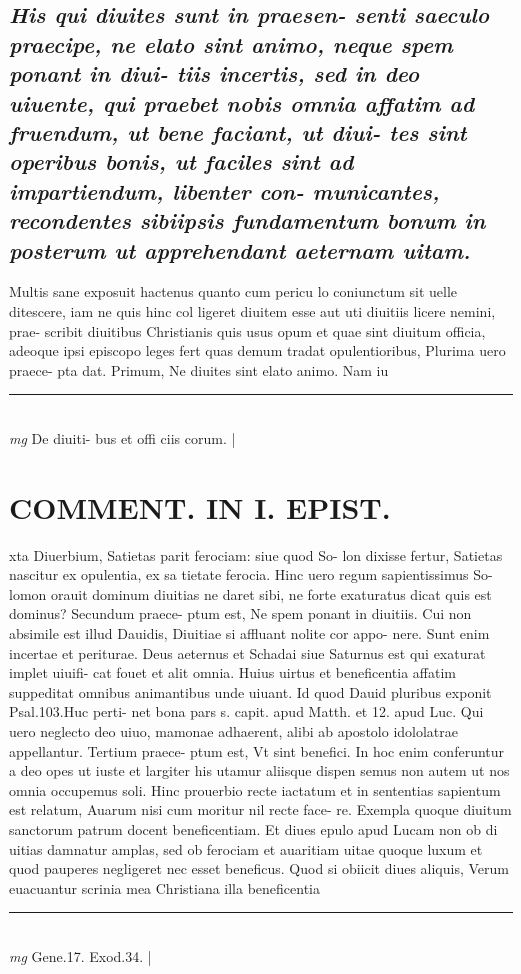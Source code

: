 \documentclass{article}
\begin{document}
\begin{pages}
\subsection*{\textit{His qui diuites sunt in praesen- senti saeculo praecipe, ne elato sint animo, neque spem ponant in diui- tiis incertis, sed in deo uiuente, qui praebet nobis omnia affatim ad fruendum, ut bene faciant, ut diui- tes sint operibus bonis, ut faciles sint ad impartiendum, libenter con- municantes, recondentes sibiipsis fundamentum bonum in posterum ut apprehendant aeternam uitam. }}\pstart Multis sane exposuit hactenus quanto cum pericu lo coniunctum sit uelle ditescere, iam ne quis hinc col ligeret diuitem esse aut uti diuitiis licere nemini, prae- scribit diuitibus Christianis quis usus opum et quae sint diuitum officia, adeoque ipsi episcopo leges fert quas demum tradat opulentioribus, Plurima uero praece- pta dat. Primum, Ne diuites sint elato animo. Nam iu  \pend
\vspace{0.5cm}\noindent
\vspace{0.2cm}\rule{1cm}{0.2pt}\\ 
\hspace{0.2cm}\textit{mg}
\footnotesize De diuiti- bus et offi ciis corum. 
\normalsize| 
\section*{COMMENT. IN I. EPIST. }\pstart xta Diuerbium, Satietas parit ferociam: siue quod So- lon dixisse fertur, Satietas nascitur ex opulentia, ex sa tietate ferocia. Hinc uero regum sapientissimus So- lomon orauit dominum diuitias ne daret sibi, ne forte exaturatus dicat quis est dominus? Secundum praece- ptum est, Ne spem ponant in diuitiis. Cui non absimile est illud Dauidis, Diuitiae si affluant nolite cor appo- nere. Sunt enim incertae et periturae. Deus aeternus et Schadai siue Saturnus est qui exaturat implet uiuifi- cat fouet et alit omnia. Huius uirtus et beneficentia affatim suppeditat omnibus animantibus unde uiuant. Id quod Dauid pluribus exponit Psal.103.Huc perti- net bona pars s. capit. apud Matth. et 12. apud Luc. Qui uero neglecto deo uiuo, mamonae adhaerent, alibi ab apostolo idololatrae appellantur. Tertium praece- ptum est, Vt sint benefici. In hoc enim conferuntur a deo opes ut iuste et largiter his utamur aliisque dispen semus non autem ut nos omnia occupemus soli. Hinc prouerbio recte iactatum et in sententias sapientum est relatum, Auarum nisi cum moritur nil recte face- re. Exempla quoque diuitum sanctorum patrum docent beneficentiam. Et diues epulo apud Lucam non ob di uitias damnatur amplas, sed ob ferociam et auaritiam uitae quoque luxum et quod pauperes negligeret nec esset beneficus. Quod si obiicit diues aliquis, Verum euacuantur scrinia mea Christiana illa beneficentia  \pend
\vspace{0.5cm}\noindent
\vspace{0.2cm}\rule{1cm}{0.2pt}\\ 
\hspace{0.2cm}\textit{mg}
\footnotesize Gene.17. Exod.34. 
\normalsize| 

\end{pages}
\end{document}
